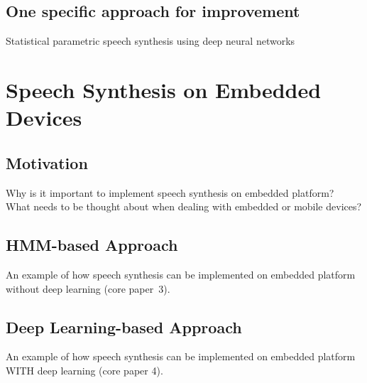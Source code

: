 \subsection{One specific approach for improvement}
\label{subsec:deepspss}

Statistical parametric speech synthesis using deep neural networks \cite{zen:deepstatistical}


\section{Speech Synthesis on Embedded Devices}
\label{sec:embeddedspeech}

\subsection{Motivation}
\label{subsec:motembedded}

Why is it important to implement speech synthesis on embedded platform?\\
What needs to be thought about when dealing with embedded or mobile devices?

\subsection{\ac{HMM}-based Approach}
\label{subsec:hmmembedded}

An example of how speech synthesis can be implemented on embedded platform without deep learning (core paper~3).

\subsection{Deep Learning-based Approach}
\label{subsec:deepembedded}

An example of how speech synthesis can be implemented on embedded platform WITH deep learning (core paper 4).

\clearpage
